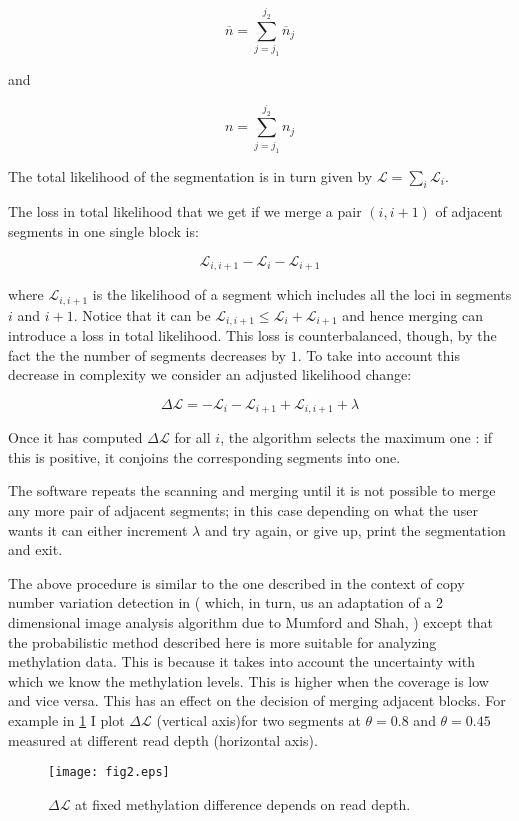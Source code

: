 \documentclass[12pt]{amsart}
\newcommand{\lik}{\ensuremath{\mathcal{L}}}
\begin{document}
\[
\overline{n}=\sum_{j=j_1}^{j_2} \overline{n}_j
\]

and

\[
n=\sum_{j=j_1}^{j_2} n_j
\]


The total likelihood of the segmentation is in turn given by 
$\mathcal{L}=\sum_i\mathcal{L}_i$.

The loss in 
total likelihood that we get if we merge a pair $(i,i+1)$ of 
adjacent segments in one single block is:

\[\mathcal{L}_{i,i+1}-\mathcal{L}_i-\mathcal{L}_{i+1}\]

where $\mathcal{L}_{i,i+1}$ is the likelihood of a segment which includes
all the loci in segments $i$ and $i+1$.
Notice that it can be  $\mathcal{L}_{i,i+1} \leq \mathcal{L}_i+\mathcal{L}_{i+1}$ and hence merging  
can introduce a loss in total 
likelihood. This loss is counterbalanced, though, by the fact the the number 
of segments decreases by $1$. To take into account this decrease in 
complexity we consider an adjusted likelihood change:

\[\Delta  \lik = -\mathcal{L}_i-\mathcal{L}_{i+1}+\mathcal{L}_{i,i+1} + \lambda\]

Once it has computed 
$\Delta  \lik$ for all $i$, the algorithm selects the maximum 
one : if this is positive, it conjoins the corresponding segments into one.

The software repeats the scanning and merging until it is not possible to 
merge any more pair of adjacent segments; in this case depending on what the 
user wants it can either increment $\lambda$ and try again, 
or give up, print the segmentation and exit.

The above procedure is similar to the one
described in the context of copy number variation detection in \cite{vega} 
( which, in turn, us an adaptation 
of a 2 dimensional image analysis algorithm due to Mumford and Shah, 
\cite{mumfordshah}) except that the probabilistic method  described
here is more suitable for analyzing methylation data. This is because it takes into account the
uncertainty with which we know the methylation levels. This is higher when the coverage is low and vice versa.
This has an effect on the decision of merging adjacent blocks. For example in \ref{fig2} I plot
$\Delta  \lik$  (vertical axis)for two segments at $\theta=0.8$ and $\theta=0.45$ measured at different read depth
(horizontal axis).

\begin{figure}\label{fig2}
\texttt{[image: fig2.eps]}
\caption{$\Delta  \lik$ at fixed methylation difference depends on read depth.}
\end{figure}
\end{document}

